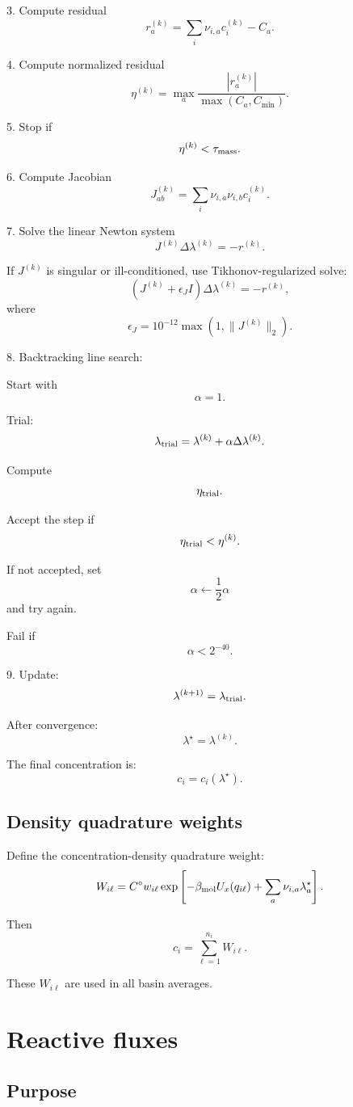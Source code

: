 \documentclass[11pt]{article}
\begin{document}
3. Compute residual
\[
r_a^{(k)}
=
\sum_i\nu_{i,a}c_i^{(k)}-C_a.
\]

4. Compute normalized residual
\[
\eta^{(k)}
=
\max_a
\frac{|r_a^{(k)}|}
{\max(C_a,C_{\min})}.
\]

5. Stop if
\[
\eta^{(k)}<\tau_{\rm mass}.
\]

6. Compute Jacobian
\[
J_{ab}^{(k)}
=
\sum_i\nu_{i,a}\nu_{i,b}c_i^{(k)}.
\]

7. Solve the linear Newton system
\[
J^{(k)}\Delta\lambda^{(k)}=-r^{(k)}.
\]

If \(J^{(k)}\) is singular or ill-conditioned, use Tikhonov-regularized solve:
\[
\left(J^{(k)}+\epsilon_J I\right)\Delta\lambda^{(k)}=-r^{(k)},
\]
where
\[
\epsilon_J=10^{-12}\max(1,\|J^{(k)}\|_2).
\]

8. Backtracking line search:

Start with
\[
\alpha=1.
\]

Trial:
\[
\lambda_{\rm trial}=\lambda^{(k)}+\alpha\Delta\lambda^{(k)}.
\]

Compute
\[
\eta_{\rm trial}.
\]

Accept the step if
\[
\eta_{\rm trial}<\eta^{(k)}.
\]

If not accepted, set
\[
\alpha\leftarrow \frac12\alpha
\]
and try again.

Fail if
\[
\alpha<2^{-40}.
\]

9. Update:
\[
\lambda^{(k+1)}=\lambda_{\rm trial}.
\]

After convergence:
\[
\lambda^\star=\lambda^{(k)}.
\]

The final concentration is:
\[
c_i=c_i(\lambda^\star).
\]

\subsection{Density quadrature weights}

Define the concentration-density quadrature weight:
\[
W_{i\ell}
=
C^\circ
w_{i\ell}
\exp
\left[
-\beta_{\rm mol}U_x(q_{i\ell})
+
\sum_a\nu_{i,a}\lambda_a^\star
\right].
\]

Then
\[
c_i=\sum_{\ell=1}^{n_i}W_{i\ell}.
\]

These \(W_{i\ell}\) are used in all basin averages.

\section{Reactive fluxes}
\label{sec:fluxes}

\subsection{Purpose}
\end{document}
